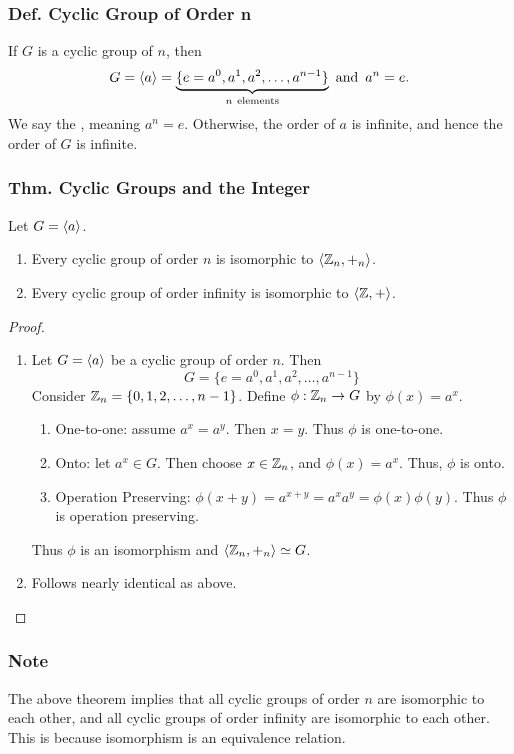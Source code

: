 \subsubsection{Def. Cyclic Group of Order n}
If $G$ is a cyclic group of  $n$, then
\[
    G = \langle a \rangle = \underbrace{\{e = a^0, a^1, a^2, \ldots, a^{n-1}\}}_{n~\text{elements}} \operatorname{~\text{and}~} a^n = e.
\]
We say the , meaning $a^n = e$. Otherwise, the order of $a$ is infinite, and hence the order of $G$ is infinite.

\subsubsection{Thm. Cyclic Groups and the Integer}
Let $G = \langle a \rangle$.
\begin{enumerate}
    \item Every cyclic group of order $n$ is isomorphic to $\langle \mathbb{Z}_n,+_n \rangle$.
    \item Every cyclic group of order infinity is isomorphic to $\langle \mathbb{Z}, + \rangle$.
\end{enumerate}

\begin{proof}
    \begin{enumerate}
        \item Let $G = \langle a \rangle$ be a cyclic group of order $n$. Then
        \[
            G = \{e=a^0, a^1, a^2, \ldots, a^{n-1}\}
        \]
        Consider $\mathbb{Z}_n = \{0,1,2,\ldots,n-1\}$. Define $\phi: \mathbb{Z}_n \rightarrow G$ by $\phi(x) = a^x$.
        \begin{enumerate}
            \item One-to-one: assume $a^x = a^y$. Then $x=y$. Thus $\phi$ is one-to-one.
            \item Onto: let $a^x \in G$. Then choose $x \in \mathbb{Z}_n$, and $\phi(x) = a^x$. Thus, $\phi$ is onto.
            \item Operation Preserving: $\phi(x+y) = a^{x+y} = a^xa^y = \phi(x)\phi(y)$. Thus $\phi$ is operation preserving.
        \end{enumerate}
        Thus $\phi$ is an isomorphism and $\langle \mathbb{Z}_n,+_n \rangle \simeq G$.
        \item Follows nearly identical as above.
    \end{enumerate}
\end{proof}

\subsubsection*{Note}
The above theorem implies that all cyclic groups of order $n$ are isomorphic to each other, and all cyclic groups of order infinity are isomorphic to each other. This is because isomorphism is an equivalence relation.

